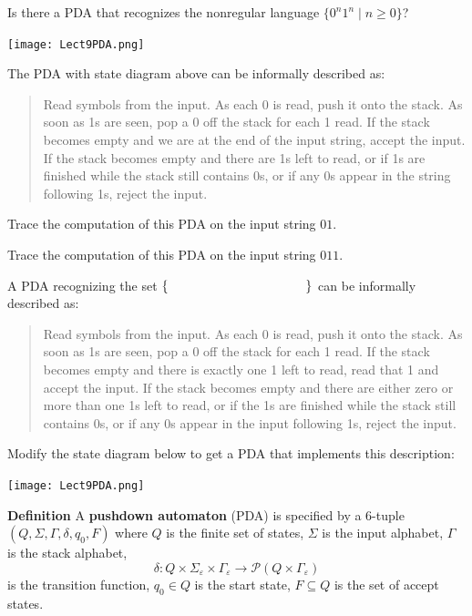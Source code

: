 \documentclass[12pt, oneside]{article}
\begin{document}
\vfill

\vfill

Is there a PDA that recognizes the nonregular language $\{0^n1^n \mid n \geq 0 \}$?

\vfill

\newpage


\texttt{[image: Lect9PDA.png]}

The PDA with state diagram above can be informally described as:
\begin{quote}
    Read symbols from the input. As each 0 is read, push it onto the stack. 
    As soon as 1s are seen, pop a 0 off the stack for each 1 read. 
    If the stack becomes empty and we are at the end of the input string, accept the input. 
    If the stack becomes empty and there are 1s left to read, 
    or if 1s are finished while the stack still contains 0s, or if any 0s
    appear in the string following 1s, 
    reject the input.
\end{quote}
    

Trace the computation of this PDA on the input string $01$.

\vfill
    
Trace the computation of this PDA on the input string $011$.

\vfill

\newpage
A PDA recognizing the set $\{ \hspace{1.5 in} \}$ can be informally described as:
\begin{quote}
    Read symbols from the input. As each 0 is read, push it onto the stack. 
    As soon as 1s are seen, pop a 0 off the stack for each 1 read. 
    If the stack becomes empty and there is exactly one 1 left to read, read that 1 and accept the input. 
    If the stack becomes empty and there are either zero or more than one 1s left to read, 
    or if the 1s are finished while the stack still contains 0s, or if any 0s appear in the input following 1s, 
    reject the input.
\end{quote}
Modify the state diagram below to get a PDA that implements this description:

\texttt{[image: Lect9PDA.png]}


\vfill
{\bf Definition} A {\bf pushdown automaton} (PDA) is  specified by a  $6$-tuple $(Q, \Sigma, \Gamma, \delta, q_0, F)$
where $Q$ is the finite set of states, $\Sigma$ is the input alphabet,  $\Gamma$ is the stack alphabet,
\[
    \delta: Q \times \Sigma_\varepsilon  \times  \Gamma_\varepsilon \to \mathcal{P}( Q \times \Gamma_\varepsilon)
\]
is the transition function,  $q_0 \in Q$ is the start state, $F \subseteq  Q$ is the set of accept states.
    
\end{document}
